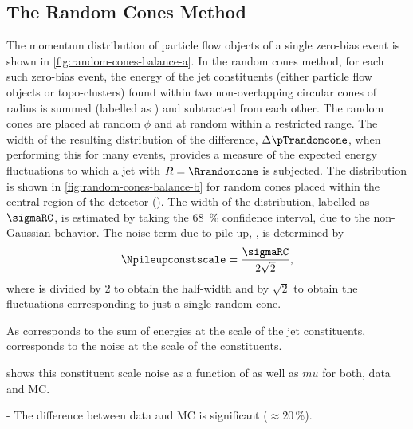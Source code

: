 


\subsection{The Random Cones Method}
\label{subsec:random-cones-method}


The momentum distribution of particle flow objects of a single zero-bias event is shown in \cref{fig:random-cones-balance-a}. 
In the random cones method, for each such zero-bias event, the energy of the jet constituents (either particle flow objects or topo-clusters) found within two non-overlapping circular cones of radius \Rrandomcone is summed (labelled as \pTrandomcone) and subtracted from each other.
The random cones are placed at random $\phi$ and at random \abseta within a restricted range.
The width of the resulting distribution of the \pTrandomcone difference, $\Delta \pTrandomcone$, when performing this for many events, provides a measure of the expected energy fluctuations to which a jet with $R = \Rrandomcone$ is subjected.
The distribution is shown in \cref{fig:random-cones-balance-b} for random cones placed within the central region of the detector (). The width of the distribution, labelled as $\sigmaRC$, is estimated by taking the \SI{68}{\percent} confidence interval, due to the non-Gaussian behavior.
The noise term due to pile-up, \Npileupconstscale, is determined by 
\begin{equation}
    \Npileupconstscale = \frac{\sigmaRC}{2\sqrt{2}},
\end{equation}
where \sigmaRC is divided by 2 to obtain the half-width and by $\sqrt{2}$ to obtain the fluctuations corresponding to just a single random cone. 


As \pTrandomcone corresponds to the sum of energies at the scale of the jet constituents, \Npileup corresponds to the noise at the scale of the constituents.


 shows this constituent scale noise as a function of \abseta as well as $mu$ for both, data and MC.

- The difference between data and MC is significant ($\approx 20\,\%$).

